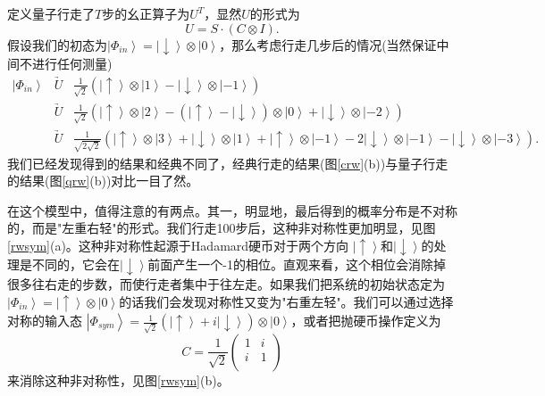 定义量子行走了$T$步的幺正算子为$U^T$，显然$U$的形式为
 \begin{equation}
          U = S\cdot(C\otimes I).
\end{equation}
假设我们的初态为$\left\vert \Phi_{in} \right \rangle = \left\vert \downarrow \right \rangle \otimes \left\vert 0 \right \rangle$，那么考虑行走几步后的情况(当然保证中间不进行任何测量)
\begin{eqnarray}
   \left\vert \Phi_{in} \right \rangle  & \underrightarrow{U}   &  \frac{1}{\sqrt{2}}(\left\vert \uparrow \right \rangle \otimes  \left\vert 1 \right \rangle - \left\vert \downarrow \right \rangle \otimes \left\vert -1 \right \rangle) \nonumber \\
   & \underrightarrow{U}   &  \frac{1}{\sqrt{2}}(\left\vert \uparrow \right \rangle \otimes  \left\vert 2 \right \rangle -
  (\left\vert \uparrow \right \rangle-\left\vert \downarrow \right \rangle) \otimes  \left\vert 0 \right \rangle+
  \left\vert \downarrow \right \rangle \otimes \left\vert -2 \right \rangle) \nonumber \\
   & \underrightarrow{U}   & \frac{1}{\sqrt{2\sqrt{2}}}(\left\vert \uparrow \right \rangle \otimes  \left\vert 3 \right \rangle + \left\vert \downarrow \right \rangle \otimes  \left\vert 1 \right \rangle+\left\vert \uparrow \right \rangle \otimes  \left\vert -1 \right \rangle-2\left\vert \downarrow \right \rangle \otimes  \left\vert -1 \right \rangle-\left\vert \downarrow \right \rangle \otimes  \left\vert -3 \right \rangle).
\end{eqnarray}
我们已经发现得到的结果和经典不同了，经典行走的结果(图\ref{crw}(b))与量子行走的结果(图\ref{qrw}(b))对比一目了然。

在这个模型中，值得注意的有两点。其一，明显地，最后得到的概率分布是不对称的，而是"左重右轻"的形式。我们行走100步后，这种非对称性更加明显，见图\ref{rwsym}(a)。这种非对称性起源于Hadamard硬币对于两个方向
$\left\vert\uparrow \right \rangle$和$\left\vert \downarrow \right \rangle$的处理是不同的，它会在$\left\vert \downarrow \right \rangle$前面产生一个-1的相位。直观来看，这个相位会消除掉很多往右走的步数，而使行走者集中于往左走。如果我们把系统的初始状态定为
$\left\vert \Phi_{in} \right \rangle = \left\vert \uparrow \right \rangle \otimes \left\vert 0 \right \rangle$的话我们会发现对称性又变为"右重左轻"。我们可以通过选择对称的输入态
$\left\vert \Phi_{sym} \right \rangle = \frac{1}{\sqrt{2}}(\left\vert \uparrow \right \rangle+ i\left\vert\downarrow \right \rangle)\otimes \left\vert 0 \right \rangle$，或者把抛硬币操作定义为
\begin{equation}
          C = \frac{1}{\sqrt{2}}\left(
                \begin{array}{cc}
                  1 & i \\
                  i& 1 \\
                \end{array}
              \right)
\end{equation}
来消除这种非对称性，见图\ref{rwsym}(b)。

